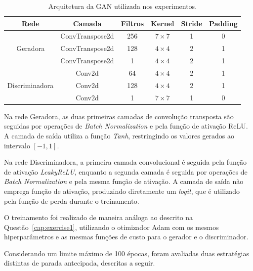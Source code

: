 \begin{table}[H]
\centering
\caption{Arquitetura da GAN utilizada nos experimentos.}
\label{tab:gan_architecture}
\renewcommand{\arraystretch}{1.2}
\begin{tabular}{|c|c|c|c|c|c|}
\hline
\textbf{Rede} & \textbf{Camada} & \textbf{Filtros} & \textbf{Kernel} & \textbf{Stride} & \textbf{Padding} \\
\hline
\multirow{3}{*}{Geradora}
& ConvTranspose2d & 256 & $7\times7$ & 1 & 0 \\
& ConvTranspose2d & 128 & $4\times4$ & 2 & 1 \\
& ConvTranspose2d & 1 & $4\times4$ & 2 & 1 \\
\hline
\multirow{3}{*}{Discriminadora}
& Conv2d & 64 & $4\times4$ & 2 & 1 \\
& Conv2d & 128 & $4\times4$ & 2 & 1 \\
& Conv2d & 1 & $7\times7$ & 1 & 0 \\
\hline
\end{tabular}
\end{table}

Na rede Geradora, as duas primeiras camadas de convolução transposta são seguidas por operações de \textit{Batch Normalization} e pela função de ativação ReLU. A camada de saída utiliza a função \textit{Tanh}, restringindo os valores gerados ao intervalo $[-1,1]$.

Na rede Discriminadora, a primeira camada convolucional é seguida pela função de ativação \textit{LeakyReLU}, enquanto a segunda camada é seguida por operações de \textit{Batch Normalization} e pela mesma função de ativação. A camada de saída não emprega função de ativação, produzindo diretamente um \textit{logit}, que é utilizado pela função de perda durante o treinamento.

O treinamento foi realizado de maneira análoga ao descrito na Questão~\ref{cap:exercise1}, utilizando o otimizador Adam com os mesmos hiperparâmetros e as mesmas funções de custo para o gerador e o discriminador.

Considerando um limite máximo de 100 épocas, foram avaliadas duas estratégias distintas de parada antecipada, descritas a seguir.

